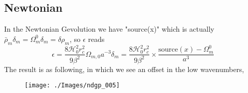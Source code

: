 \documentclass[a4paper,10pt]{article}
\def\be{\begin{equation}}
\def\ee{\end{equation}}
\newcommand{\HH}{\mathcal H}
\begin{document}
\subsection{Newtonian}
In the Newtonian Gevolution we have "source(x)" which is actually $\bar{\rho}_m \delta_m =\Omega_m^0 \delta_m = \delta \rho_m$, so $\epsilon$ reads
\be
\epsilon  =  \frac{8 \HH_0^2 r_c^2}{9 \beta^2} \Omega_{m,0} a^{-3} \delta_m =   \frac{8 \HH_0^2 r_c^2}{9 \beta^2} \times  \frac{ \text{source}(x)- \Omega_m^0}{a^3}
\ee
The result is as following, in which we see an offset in the low wavenumbers,
    \begin{figure}[H]
 \texttt{[image: ./Images/ndgp\_005]}  
 \end{figure} 
\end{document}
